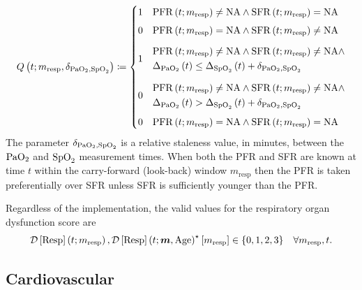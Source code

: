 \documentclass[letterpaper,10pt]{article}
\begin{document}
\begin{equation}
  \label{eq:pfr-sfr-selector}
  Q\left(t; m_{\mathrm{resp}}, \delta_{\mathrm{PaO}_{2},\mathrm{SpO}_{2}}\right) \coloneqq
  \begin{cases}
    1 & \mathrm{PFR}\left(t; m_{\mathrm{resp}}\right) \ne \mathrm{NA} \wedge \mathrm{SFR}\left(t; m_{\mathrm{resp}}\right) = \mathrm{NA} \\[1.0ex]
    0 & \mathrm{PFR}\left(t; m_{\mathrm{resp}}\right) = \mathrm{NA} \wedge \mathrm{SFR}\left(t; m_{\mathrm{resp}}\right) \ne \mathrm{NA} \\[2.0ex]
    1 & \begin{aligned} & \mathrm{PFR}\left(t; m_{\mathrm{resp}}\right) \ne \mathrm{NA} \wedge \mathrm{SFR}\left(t; m_{\mathrm{resp}}\right) \ne \mathrm{NA} \wedge \\ & \Delta_{\mathrm{PaO}_{2}}\left(t\right) \leq \Delta_{\mathrm{SpO}_{2}}\left(t\right) + \delta_{\mathrm{PaO}_{2},\mathrm{SpO}_{2}} \end{aligned} \\[4.0ex]
    0 & \begin{aligned} & \mathrm{PFR}\left(t; m_{\mathrm{resp}}\right) \ne \mathrm{NA} \wedge \mathrm{SFR}\left(t; m_{\mathrm{resp}}\right) \ne \mathrm{NA} \wedge \\ & \Delta_{\mathrm{PaO}_{2}}\left(t\right) >    \Delta_{\mathrm{SpO}_{2}}\left(t\right) + \delta_{\mathrm{PaO}_{2},\mathrm{SpO}_{2}} \end{aligned} \\[3.0ex]
    0 & \mathrm{PFR}\left(t; m_{\mathrm{resp}}\right) = \mathrm{NA} \wedge \mathrm{SFR}\left(t; m_{\mathrm{resp}}\right) = \mathrm{NA}
  \end{cases}
\end{equation}
The parameter $\delta_{\mathrm{PaO}_{2},\mathrm{SpO}_{2}}$ is a relative staleness value, in
minutes, between the $\mathrm{PaO}_{2}$ and $\mathrm{SpO}_{2}$ measurement times.  When both the
PFR and SFR are known at time $t$ within the carry-forward (look-back)
window $m_{\mathrm{resp}}$ then the PFR is taken preferentially over SFR unless
SFR is sufficiently younger than the PFR.

Regardless of the implementation, the valid values for the respiratory organ
dysfunction score are
\begin{equation}
  \label{eq:resp-valid-values}
  \DS{Resp}[\m{resp}], \DS{Resp}^{\star}[\m{resp}]
  \in \{0, 1, 2, 3\} \quad \forall \m{resp}, t.
\end{equation}

\subsection{Cardiovascular}\label{sec:card}
\end{document}
